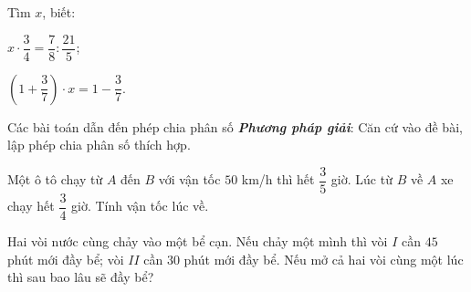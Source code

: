 \begin{vd}%
Tìm $ x $, biết$\colon$
	\begin{enumEX}{2}
		\item $x \cdot \dfrac{3}{4}=\dfrac{7}{8} : \dfrac{21}{5}$;
		\item $ \left(1+\dfrac{3}{7}\right) \cdot x=1-\dfrac{3}{7}$.
	\end{enumEX}	
\end{vd}
\begin{dang}{Các bài toán dẫn đến phép chia phân số}
\textbf{\textit{Phương pháp giải}}:	Căn cứ vào đề bài, lập phép chia phân số thích hợp.
\end{dang}
\setcounter{vd}{0}
\begin{vd}%
	Một ô tô chạy từ $A$ đến $B$ với vận tốc $50$ km/h thì hết $ \dfrac{3}{5} $ giờ. Lúc từ $B$ về $A$ xe chạy hết $ \dfrac{3}{4} $ giờ. Tính vận tốc lúc về.
\end{vd}
\begin{vd}%
	Hai vòi nước cùng chảy vào một bể cạn. Nếu chảy một mình thì vòi $ I $ cần $ 45 $ phút mới đầy bể; vòi $ II $ cần $ 30 $ phút mới đầy bể. Nếu mở cả hai vòi cùng một lúc thì sau bao lâu sẽ đầy bể?
\end{vd}
